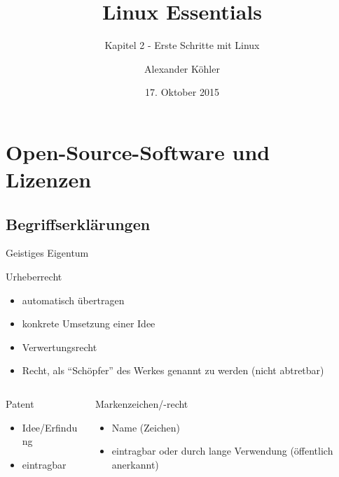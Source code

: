 \documentclass[aspectratio=43]{beamer}
\title[Linux Essentials  - Kapitel 2 - Erste Schritte mit Linux]{Linux Essentials}
\subtitle{Kapitel 2 - Erste Schritte mit Linux}
\author{Alexander Köhler}
\date{17. Oktober 2015}
\begin{document}
\logoframe

\frame{\titlepage}


\setcounter{tocdepth}{1}
\section[Gliederung]{}
\frame{\tableofcontents}


\section{Open-Source-Software und Lizenzen}
\subsection{Begriffserklärungen}

\begin{frame}{Geistiges Eigentum}
  \begin{block}{Urheberrecht}
    \begin{itemize}
      \item automatisch übertragen
      \item konkrete Umsetzung einer Idee
      \item Verwertungsrecht
      \item Recht, als "`Schöpfer"' des Werkes genannt zu werden (nicht abtretbar)
    \end{itemize}
  \end{block}
  \begin{columns}
    \begin{column}{.3\textwidth}
      \begin{block}{Patent}
        \begin{itemize}
          \item Idee/Erfindung
          \item eintragbar
        \end{itemize}
      \end{block}
    \end{column}
    \begin{column}{.7\textwidth}
      \begin{block}{Markenzeichen/-recht}
        \begin{itemize}
          \item Name (Zeichen)
          \item eintragbar oder durch lange Verwendung (öffentlich anerkannt)
        \end{itemize}
      \end{block}
    \end{column}
  \end{columns}
\end{frame}
\end{document}
